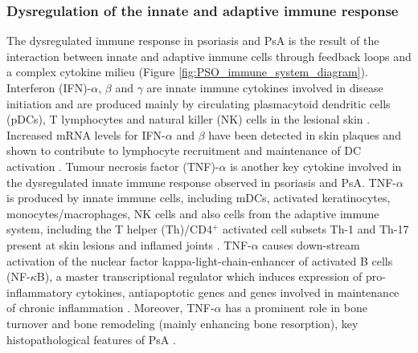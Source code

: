 \subsubsection*{Dysregulation of the innate and adaptive immune response}
The dysregulated immune response in psoriasis and PsA is the result of the interaction between innate and adaptive immune cells through feedback loops and a complex cytokine milieu (Figure \ref{fig:PSO_immune_system_diagram}). Interferon (IFN)-$\alpha$, $\beta$ and $\gamma$ are innate immune cytokines involved in disease initiation and are produced mainly by circulating plasmacytoid dendritic cells (pDCs), T lymphocytes and natural killer (NK) cells in the lesional skin \parencite{Johnson-Huang2009,Perera2012,Hijnen2013}. Increased mRNA levels for IFN-$\alpha$ and $\beta$ have been detected in skin plaques and shown to contribute to lymphocyte recruitment and maintenance of DC activation \parencite{Schmid1994}. Tumour necrosis factor (TNF)-$\alpha$ is another key cytokine involved in the dysregulated innate immune response observed in psoriasis and PsA. TNF-$\alpha$ is produced by innate immune cells, including mDCs, activated keratinocytes, monocytes/macrophages, NK cells
 and also cells from the adaptive immune system, including the T helper (Th)/CD4$^+$ activated cell subsets Th-1 and Th-17 present at skin lesions and inflamed joints \parencite{Perera2012,Lizzul2005}. TNF-$\alpha$ causes down-stream activation of the nuclear factor kappa-light-chain-enhancer of activated B cells (NF-$\kappa$B), a master transcriptional regulator which induces expression of pro-inflammatory cytokines, antiapoptotic genes and genes involved in maintenance of chronic inflammation \parencite{Lizzul2005, Johansen2004}. Moreover, TNF-$\alpha$ has a prominent role in bone turnover and bone remodeling (mainly enhancing bone resorption), key histopathological features of PsA \parencite{Mensah2008}. 

